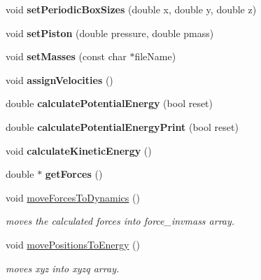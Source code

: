 \begin{DoxyCompactItemize}
void {\bfseries set\+Periodic\+Box\+Sizes} (double x, double y, double z)
\item 
\hypertarget{classCudaSimulationContext_a8ce96a9eabd558ea3ffed21b2c515156}{}\label{classCudaSimulationContext_a8ce96a9eabd558ea3ffed21b2c515156} 
void {\bfseries set\+Piston} (double pressure, double pmass)
\item 
\hypertarget{classCudaSimulationContext_a96308a25437fb86cf88d5d7f59b560fc}{}\label{classCudaSimulationContext_a96308a25437fb86cf88d5d7f59b560fc} 
void {\bfseries set\+Masses} (const char $\ast$file\+Name)
\item 
\hypertarget{classCudaSimulationContext_a3b73f0eca80dd810e1bc593bc2ed2698}{}\label{classCudaSimulationContext_a3b73f0eca80dd810e1bc593bc2ed2698} 
void {\bfseries assign\+Velocities} ()
\item 
\hypertarget{classCudaSimulationContext_aeec06154411dccd89321fa2b594f20b9}{}\label{classCudaSimulationContext_aeec06154411dccd89321fa2b594f20b9} 
double {\bfseries calculate\+Potential\+Energy} (bool reset)
\item 
\hypertarget{classCudaSimulationContext_a1f25e0255919e0df3d49356b51ff3a0e}{}\label{classCudaSimulationContext_a1f25e0255919e0df3d49356b51ff3a0e} 
double {\bfseries calculate\+Potential\+Energy\+Print} (bool reset)
\item 
\hypertarget{classCudaSimulationContext_ad47a55e5a08360f5bb5bbdffc0c9e9dd}{}\label{classCudaSimulationContext_ad47a55e5a08360f5bb5bbdffc0c9e9dd} 
void {\bfseries calculate\+Kinetic\+Energy} ()
\item 
\hypertarget{classCudaSimulationContext_acdd86fc36567944c4433dc1616b0ac7a}{}\label{classCudaSimulationContext_acdd86fc36567944c4433dc1616b0ac7a} 
double $\ast$ {\bfseries get\+Forces} ()
\item 
void \hyperlink{classCudaSimulationContext_af8e340b880ef23301085fc702226c609}{move\+Forces\+To\+Dynamics} ()
\begin{DoxyCompactList}\small\item\em moves the calculated forces into force\+\_\+invmass array. \end{DoxyCompactList}\item 
void \hyperlink{classCudaSimulationContext_a3f3e6058db0acba85a440d9417c5e7e2}{move\+Positions\+To\+Energy} ()
\begin{DoxyCompactList}\small\item\em moves xyz into xyzq array. \end{DoxyCompactList}\item 

\end{DoxyCompactItemize}
